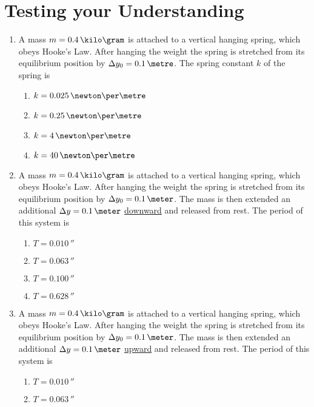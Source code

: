 










\section{Testing your Understanding}

\begin{enumerate}
\item A mass $m = 0.4\,\kilo\gram$ is attached to a vertical hanging spring, which obeys Hooke's Law. After hanging the weight the spring is stretched from its equilibrium position by $\Delta y_0 = 0.1\,\metre$. The spring constant $k$ of the spring is
  \begin{enumerate}
  \item $k = 0.025\,\newton\per\metre$
  \item $k = 0.25 \,\newton\per\metre$
  \item $k = 4    \,\newton\per\metre$
  \item $k = 40   \,\newton\per\metre$
  \end{enumerate}
\item A mass $m = 0.4\,\kilo\gram$ is attached to a vertical hanging spring, which obeys Hooke's Law. After hanging the weight the spring is stretched from its equilibrium position by $\Delta y_0 = 0.1\,\meter$. The mass is then extended an additional $\Delta y = 0.1\,\meter$ \underline{downward} and released from rest. The period of this system is
  \begin{enumerate}
  \item $T = 0.010\,\second$
  \item $T = 0.063\,\second$
  \item $T = 0.100\,\second$
  \item $T = 0.628\,\second$
  \end{enumerate}
\item A mass $m = 0.4\,\kilo\gram$ is attached to a vertical hanging spring, which obeys Hooke's Law. After hanging the weight the spring is stretched from its equilibrium position by $\Delta y_0 = 0.1\,\meter$. The mass is then extended an additional $\Delta y = 0.1\,\meter$ \underline{upward} and released from rest. The period of this system is
  \begin{enumerate}
  \item $T = 0.010\,\second$
  \item $T = 0.063\,\second$

\end{enumerate}
\end{enumerate}
